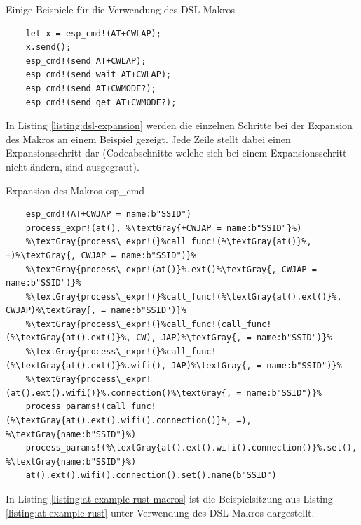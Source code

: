 \documentclass
[ 12pt,
  parskip=half %
]{scrreprt}
\newcommand{\textGray}[1]{\textcolor{gray}{#1}}
\newenvironment{mylisting}[1][H]
{\captionsetup{aboveskip=-0.2\normalbaselineskip}\begin{listing}[#1]}
{\end{listing}}
\begin{document}
\begin{mylisting}
	\caption{Einige Beispiele für die Verwendung des DSL-Makros}
	\label{listing:dsl-macro-examples}
	\begin{verbatim}
	let x = esp_cmd!(AT+CWLAP);
	x.send();
	esp_cmd!(send AT+CWLAP);
	esp_cmd!(send wait AT+CWLAP);
	esp_cmd!(send AT+CWMODE?);  
	esp_cmd!(send get AT+CWMODE?);  
	\end{verbatim}
\end{mylisting} 

In Listing \ref{listing:dsl-expansion} werden die einzelnen Schritte bei der Expansion des Makros an einem Beispiel gezeigt. Jede Zeile stellt dabei einen Expansionsschritt dar (Codeabschnitte welche sich bei einem Expansionsschritt nicht ändern, sind ausgegraut). 

\begin{mylisting}
	\caption{Expansion des Makros esp\_cmd}
	\label{listing:dsl-expansion}
	\begin{verbatim}
	esp_cmd!(AT+CWJAP = name:b"SSID")	
	process_expr!(at(), %\textGray{+CWJAP = name:b"SSID"}%)	
	%\textGray{process\_expr!(}%call_func!(%\textGray{at()}%, +)%\textGray{, CWJAP = name:b"SSID")}%
	%\textGray{process\_expr!(at()}%.ext()%\textGray{, CWJAP = name:b"SSID")}%
	%\textGray{process\_expr!(}%call_func!(%\textGray{at().ext()}%, CWJAP)%\textGray{, = name:b"SSID")}%
	%\textGray{process\_expr!(}%call_func!(call_func!(%\textGray{at().ext()}%, CW), JAP)%\textGray{, = name:b"SSID")}%
	%\textGray{process\_expr!(}%call_func!(%\textGray{at().ext()}%.wifi(), JAP)%\textGray{, = name:b"SSID")}%
	%\textGray{process\_expr!(at().ext().wifi()}%.connection()%\textGray{, = name:b"SSID")}%
	process_params!(call_func!(%\textGray{at().ext().wifi().connection()}%, =), %\textGray{name:b"SSID"}%)
	process_params!(%\textGray{at().ext().wifi().connection()}%.set(), %\textGray{name:b"SSID"}%)
	at().ext().wifi().connection().set().name(b"SSID")
	\end{verbatim}
\end{mylisting} 
	
In Listing \ref{listing:at-example-rust-macros} ist die Beispielsitzung aus Listing \ref{listing:at-example-rust} unter Verwendung des DSL-Makros dargestellt.
 
\end{document}
